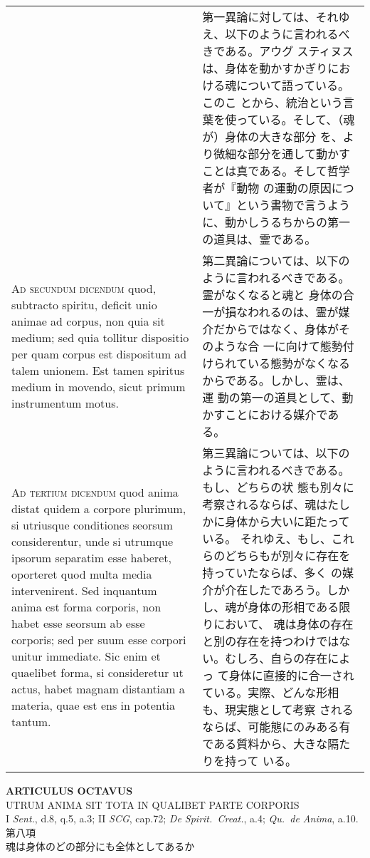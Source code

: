 \documentclass[paper=a4paper,fontsize=10pt,jafontsize=9pt,titlepage]{jlreq}
\begin{document}
\begin{longtable}{p{21em}p{21em}}
&

 第一異論に対しては、それゆえ、以下のように言われるべきである。アウグ
 スティヌスは、身体を動かすかぎりにおける魂について語っている。このこ
 とから、統治という言葉を使っている。そして、（魂が）身体の大きな部分
 を、より微細な部分を通して動かすことは真である。そして哲学者が『動物
 の運動の原因について』という書物で言うように、動かしうるちからの第一
 の道具は、霊である。

\\



{\scshape Ad secundum dicendum} quod, subtracto spiritu, deficit unio
animae ad corpus, non quia sit medium; sed quia tollitur dispositio
per quam corpus est dispositum ad talem unionem. Est tamen spiritus
medium in movendo, sicut primum instrumentum motus.

&

第二異論については、以下のように言われるべきである。霊がなくなると魂と
身体の合一が損なわれるのは、霊が媒介だからではなく、身体がそのような合
一に向けて態勢付けられている態勢がなくなるからである。しかし、霊は、運
動の第一の道具として、動かすことにおける媒介である。

\\

{\scshape Ad tertium dicendum} quod anima distat quidem a corpore
plurimum, si utriusque conditiones seorsum considerentur, unde si
utrumque ipsorum separatim esse haberet, oporteret quod multa media
intervenirent. Sed inquantum anima est forma corporis, non habet esse
seorsum ab esse corporis; sed per suum esse corpori unitur
immediate. Sic enim et quaelibet forma, si consideretur ut actus,
habet magnam distantiam a materia, quae est ens in potentia tantum.

&

 第三異論については、以下のように言われるべきである。もし、どちらの状
 態も別々に考察されるならば、魂はたしかに身体から大いに距たっている。
 それゆえ、もし、これらのどちらもが別々に存在を持っていたならば、多く
 の媒介が介在したであろう。しかし、魂が身体の形相である限りにおいて、
 魂は身体の存在と別の存在を持つわけではない。むしろ、自らの存在によっ
 て身体に直接的に合一されている。実際、どんな形相も、現実態として考察
 されるならば、可能態にのみある有である質料から、大きな隔たりを持って
 いる。
\end{longtable}
\newpage
 
\begin{center}
{\Large {\bfseries ARTICULUS OCTAVUS}}\\
{\large UTRUM ANIMA SIT TOTA IN QUALIBET PARTE CORPORIS}\\
{\footnotesize I {\itshape Sent.}, d.8, q.5, a.3; II {\itshape SCG}, cap.72; {\itshape De Spirit.~Creat.}, a.4; {\itshape Qu.~de Anima}, a.10.}\\
{\Large 第八項\\魂は身体のどの部分にも全体としてあるか}
\end{center}
\end{document}
